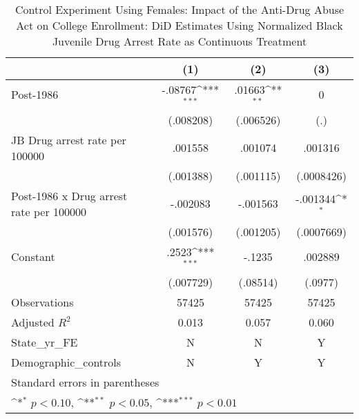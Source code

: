 \begin{table}[htbp]\centering
\def\sym#1{\ifmmode^{#1}\else\(^{#1}\)\fi}
\caption{Control Experiment Using Females: Impact of the Anti-Drug Abuse Act on College Enrollment: DiD Estimates Using Normalized Black Juvenile Drug Arrest Rate as Continuous Treatment}
\begin{tabular}{l*{3}{c}}
\hline\hline
                    &\multicolumn{1}{c}{(1)}         &\multicolumn{1}{c}{(2)}         &\multicolumn{1}{c}{(3)}         \\
\hline
Post-1986           &     -.08767\sym{***}&      .01663\sym{**} &           0         \\
                    &   (.008208)         &   (.006526)         &         (.)         \\
[1em]
JB Drug arrest rate per 100000&     .001558         &     .001074         &     .001316         \\
                    &   (.001388)         &   (.001115)         &  (.0008426)         \\
[1em]
Post-1986 x Drug arrest rate per 100000&    -.002083         &    -.001563         &    -.001344\sym{*}  \\
                    &   (.001576)         &   (.001205)         &  (.0007669)         \\
[1em]
Constant            &       .2523\sym{***}&      -.1235         &     .002889         \\
                    &   (.007729)         &    (.08514)         &     (.0977)         \\
\hline
Observations        &       57425         &       57425         &       57425         \\
Adjusted \(R^{2}\)  &       0.013         &       0.057         &       0.060         \\
State\_yr\_FE         &           N         &           N         &           Y         \\
Demographic\_controls&           N         &           Y         &           Y         \\
\hline\hline
\multicolumn{4}{l}{\footnotesize Standard errors in parentheses}\\
\multicolumn{4}{l}{\footnotesize \sym{*} \(p<0.10\), \sym{**} \(p<0.05\), \sym{***} \(p<0.01\)}\\
\end{tabular}
\end{table}
